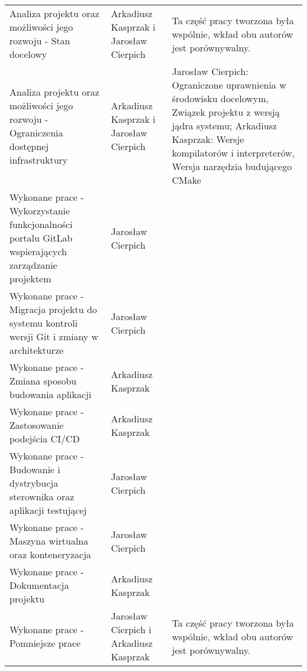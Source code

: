 \documentclass[12pt] {article}
\begin{document}
\begin{table*}[htbp]
\centering
\begin{tabularx}{\textwidth}{@{}XXX@{}}

Analiza projektu oraz możliwości jego rozwoju - Stan docelowy & Arkadiusz Kasprzak i Jarosław Cierpich & Ta część pracy tworzona była wspólnie, wkład obu autorów jest porównywalny. \\
Analiza projektu oraz możliwości jego rozwoju - Ograniczenia dostępnej infrastruktury & Arkadiusz Kasprzak i Jarosław Cierpich & Jarosław Cierpich: Ograniczone uprawnienia w środowisku docelowym, Związek projektu z wersją jądra systemu; Arkadiusz Kasprzak: Wersje kompilatorów i interpreterów, Wersja narzędzia budującego CMake \\
Wykonane prace - Wykorzystanie funkcjonalności portalu GitLab wspierających zarządzanie projektem & Jarosław Cierpich & \\
Wykonane prace - Migracja projektu do systemu kontroli wersji Git i zmiany w architekturze & Jarosław Cierpich & \\
Wykonane prace - Zmiana sposobu budowania aplikacji & Arkadiusz Kasprzak & \\
Wykonane prace - Zastosowanie podejścia CI/CD & Arkadiusz Kasprzak & \\
Wykonane prace - Budowanie i dystrybucja sterownika oraz aplikacji testującej & Jarosław Cierpich & \\
Wykonane prace - Maszyna wirtualna oraz konteneryzacja & Jarosław Cierpich & \\
Wykonane prace - Dokumentacja projektu & Arkadiusz Kasprzak & \\
Wykonane prace - Pomniejsze prace & Jarosław Cierpich i Arkadiusz Kasprzak & Ta część pracy tworzona była wspólnie, wkład obu autorów jest porównywalny. \\

\end{tabularx}
\end{table*}

\newpage
\end{document}
